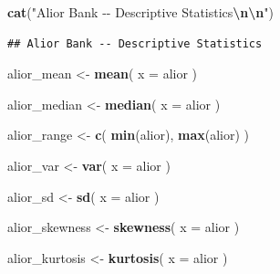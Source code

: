 \documentclass[
]{article}
\newenvironment{Shaded}{\begin{snugshade}}{\end{snugshade}}
\newcommand{\AttributeTok}[1]{\textcolor[rgb]{0.13,0.29,0.53}{#1}}
\newcommand{\FunctionTok}[1]{\textcolor[rgb]{0.13,0.29,0.53}{\textbf{#1}}}
\newcommand{\NormalTok}[1]{#1}
\newcommand{\OtherTok}[1]{\textcolor[rgb]{0.56,0.35,0.01}{#1}}
\newcommand{\SpecialCharTok}[1]{\textcolor[rgb]{0.81,0.36,0.00}{\textbf{#1}}}
\newcommand{\StringTok}[1]{\textcolor[rgb]{0.31,0.60,0.02}{#1}}
\begin{document}
\begin{Shaded}
\begin{Highlighting}[]
\FunctionTok{cat}\NormalTok{(}\StringTok{"Alior Bank {-}{-} Descriptive Statistics}\SpecialCharTok{\textbackslash{}n\textbackslash{}n}\StringTok{"}\NormalTok{)}
\end{Highlighting}
\end{Shaded}

\begin{verbatim}
## Alior Bank -- Descriptive Statistics
\end{verbatim}

\begin{Shaded}
\begin{Highlighting}[]
\NormalTok{alior\_mean }\OtherTok{\textless{}{-}} \FunctionTok{mean}\NormalTok{(}
  \AttributeTok{x =}\NormalTok{ alior}
\NormalTok{)}

\NormalTok{alior\_median }\OtherTok{\textless{}{-}} \FunctionTok{median}\NormalTok{(}
  \AttributeTok{x =}\NormalTok{ alior}
\NormalTok{)}
\end{Highlighting}
\end{Shaded}

\begin{Shaded}
\begin{Highlighting}[]
\NormalTok{alior\_range }\OtherTok{\textless{}{-}} \FunctionTok{c}\NormalTok{(}
  \FunctionTok{min}\NormalTok{(alior),}
  \FunctionTok{max}\NormalTok{(alior)}
\NormalTok{)}

\NormalTok{alior\_var }\OtherTok{\textless{}{-}} \FunctionTok{var}\NormalTok{(}
  \AttributeTok{x =}\NormalTok{ alior}
\NormalTok{)}

\NormalTok{alior\_sd }\OtherTok{\textless{}{-}} \FunctionTok{sd}\NormalTok{(}
  \AttributeTok{x =}\NormalTok{ alior}
\NormalTok{)}
\end{Highlighting}
\end{Shaded}

\begin{Shaded}
\begin{Highlighting}[]
\NormalTok{alior\_skewness }\OtherTok{\textless{}{-}} \FunctionTok{skewness}\NormalTok{(}
  \AttributeTok{x =}\NormalTok{ alior}
\NormalTok{)}

\NormalTok{alior\_kurtosis }\OtherTok{\textless{}{-}} \FunctionTok{kurtosis}\NormalTok{(}
  \AttributeTok{x =}\NormalTok{ alior}
\NormalTok{)}
\end{Highlighting}
\end{Shaded}
\end{document}
